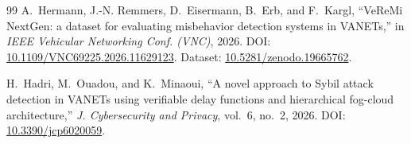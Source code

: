 \begin{thebibliography}{99}
 A.~Hermann, J.-N. Remmers, D.~Eisermann, B.~Erb, and F.~Kargl, ``VeReMi NextGen: a dataset for evaluating misbehavior detection systems in VANETs,'' in \emph{IEEE Vehicular Networking Conf. (VNC)}, 2026. DOI: \url{10.1109/VNC69225.2026.11629123}. Dataset: \url{10.5281/zenodo.19665762}.

 H.~Hadri, M.~Ouadou, and K.~Minaoui, ``A novel approach to Sybil attack detection in VANETs using verifiable delay functions and hierarchical fog-cloud architecture,'' \emph{J. Cybersecurity and Privacy}, vol.~6, no.~2, 2026. DOI: \url{10.3390/jcp6020059}.

\end{thebibliography}


